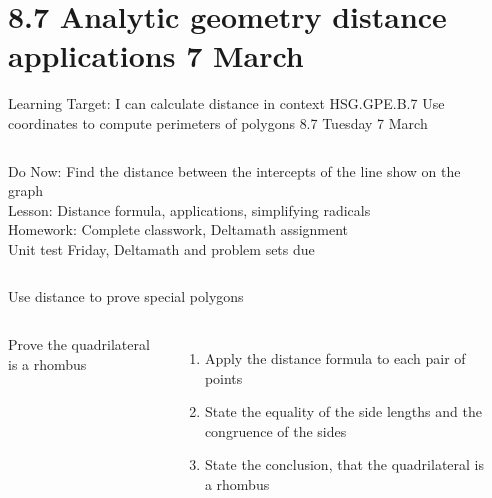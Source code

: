 \section{8.7 Analytic geometry distance applications \hfill 7 March \,}
\begin{frame}{Learning Target: I can calculate distance in context}
  {HSG.GPE.B.7 Use coordinates to compute perimeters of polygons \hfill \alert{8.7 Tuesday 7 March}}
  \begin{columns}
    Do Now: Find the distance between the intercepts of the line show on the graph \\[0.5cm]
    Lesson: Distance formula, applications, simplifying radicals \\
    Homework: Complete classwork, Deltamath assignment \\[0.5cm]
    \alert{Unit test Friday}, Deltamath and problem sets due
    \begin{flushright}
    \end{flushright}
  \end{columns}
\end{frame}

\begin{frame}{Use distance to prove special polygons}
  \begin{columns}
    Prove the quadrilateral is a rhombus
    \begin{enumerate}
      \item Apply the distance formula to each pair of points
      \item State the equality of the side lengths and the congruence of the sides
      \item State the conclusion, that the quadrilateral is a rhombus
    \end{enumerate}
    \begin{flushright}
    \end{flushright}
  \end{columns}
\end{frame}


